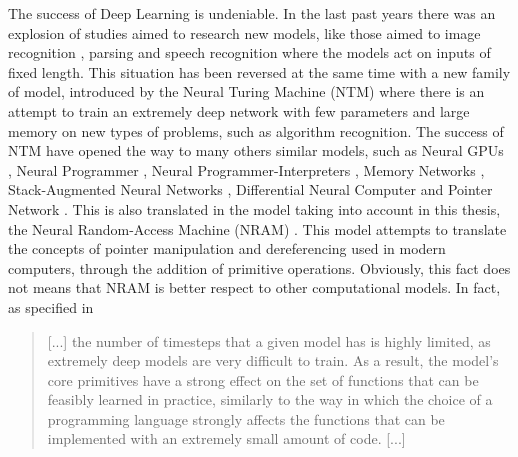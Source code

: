 The success of Deep Learning is undeniable. In the last past years there was an explosion of studies aimed to research new models, like those aimed to image recognition \cite{Krizhevsky2012ImageNetCW}, parsing \cite{Vinyals2015GrammarAA} and speech recognition \cite{Chan2015ListenAA} where the models act on inputs of fixed length. This situation has been reversed at the same time with a new family of model, introduced by the Neural Turing Machine (NTM) \cite{Graves2014NeuralTM} where there is an attempt to train an extremely deep network with few parameters and large memory on new types of problems, such as algorithm recognition. The success of NTM have opened the way to many others similar models, such as Neural GPUs \cite{Kaiser2015NeuralGL}, Neural Programmer \cite{Neelakantan2015NeuralPI}, Neural Programmer-Interpreters \cite{Reed2015NeuralP}, Memory Networks \cite{Weston2014MemoryN}, Stack-Augmented Neural Networks \cite{Joulin2015InferringAP}, Differential Neural Computer \cite{Graves2016HybridCU} and Pointer Network \cite{Vinyals2015PointerN}.
\newline \newline
This is also translated in the model taking into account in this thesis, the Neural Random-Access Machine (NRAM) \cite{NRAM:2016}. This model attempts to translate the concepts of pointer manipulation and dereferencing used in modern computers, through the addition of primitive operations. Obviously, this fact does not means that NRAM is better respect to other computational models. In fact, as specified in \cite{NRAM:2016}
\begin{quote}
[...] the number of timesteps that a given model has is highly limited, as extremely deep models are very difficult to train. As a result, the model’s core primitives have a strong effect on the set of functions that can be feasibly learned in practice, similarly to the way in which the choice of a programming language strongly affects the functions that can be implemented with an extremely small amount of code. [...]
\end{quote}

